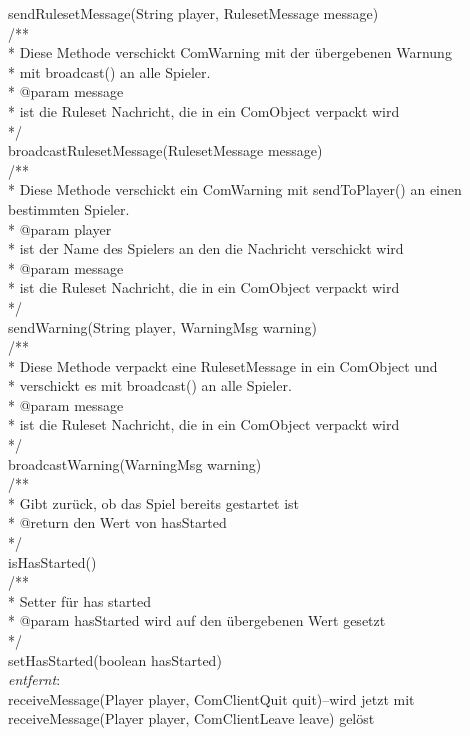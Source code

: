 \documentclass{article}
\begin{document}
\begin{itemize}
sendRulesetMessage(String player, RulesetMessage message)\\
/**\\
 * Diese Methode verschickt ComWarning mit der übergebenen Warnung \\
 * mit broadcast() an alle Spieler.\\
 * @param message\\
 *            ist die Ruleset Nachricht, die in ein ComObject verpackt wird\\
 */\\
broadcastRulesetMessage(RulesetMessage message)\\
/**\\
 * Diese Methode verschickt ein ComWarning mit sendToPlayer() an einen bestimmten Spieler.\\
 * @param player\\
 *            ist der Name des Spielers an den die Nachricht verschickt wird\\
 * @param message\\
 *            ist die Ruleset Nachricht, die in ein ComObject verpackt wird\\
 */\\
sendWarning(String player, WarningMsg warning)\\
/**\\
 * Diese Methode verpackt eine RulesetMessage in ein ComObject und\\
 * verschickt es mit broadcast() an alle Spieler.\\
 * @param message\\
 *            ist die Ruleset Nachricht, die in ein ComObject verpackt wird\\
 */\\
broadcastWarning(WarningMsg warning) \\
/**\\
 * Gibt zurück, ob das Spiel bereits gestartet ist\\
 * @return den Wert von hasStarted\\
 */\\
isHasStarted()\\
/**\\
 * Setter für has started\\
 * @param hasStarted wird auf den übergebenen Wert gesetzt\\
 */\\
setHasStarted(boolean hasStarted)\\
\textit{entfernt}: \\
receiveMessage(Player player, ComClientQuit quit)--wird jetzt mit receiveMessage(Player player, ComClientLeave leave) gelöst

\end{itemize}
\end{document}
